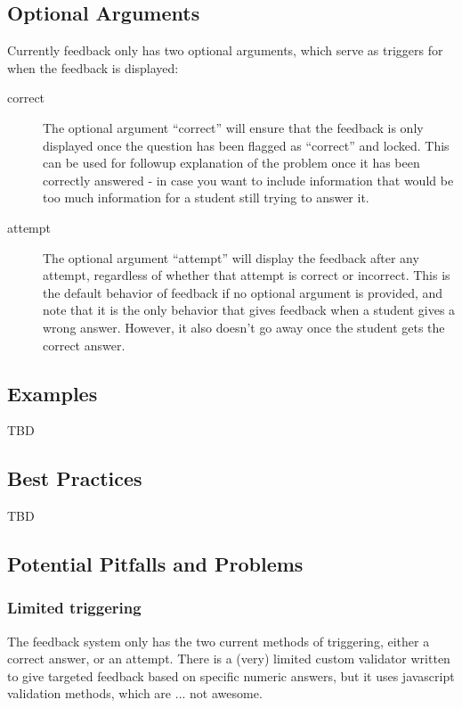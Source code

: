 \documentclass{ximera}
\begin{document}
    \subsection*{Optional Arguments}
    
        Currently feedback only has two optional arguments, which serve as triggers for when the feedback is displayed:
        
        \begin{description}
            \item[correct] The optional argument ``correct'' will ensure that the feedback is only displayed once the question has been flagged as ``correct'' and locked. This can be used for followup explanation of the problem once it has been correctly answered - in case you want to include information that would be too much information for a student still trying to answer it.
            \item[attempt] The optional argument ``attempt'' will display the feedback after any attempt, regardless of whether that attempt is correct or incorrect. This is the default behavior of feedback if no optional argument is provided, and note that it is the only behavior that gives feedback when a student gives a wrong answer. However, it also doesn't go away once the student gets the correct answer.
        \end{description}
        
    \subsection*{Examples}
    
        TBD
        
    \subsection*{Best Practices}
    
        TBD
        
        
    \subsection*{Potential Pitfalls and Problems}   
        
        \subsubsection*{Limited triggering}
            The feedback system only has the two current methods of triggering, either a correct answer, or an attempt. There is a (very) limited custom validator written to give targeted feedback based on specific numeric answers, but it uses javascript validation methods, which are ... not awesome. 
            
\end{document}
